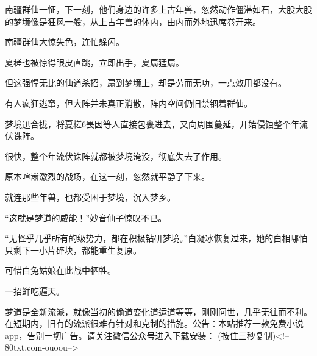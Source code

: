 \begin{this_body}
南疆群仙一怔，下一刻，他们身边的许多上古年兽，忽然动作僵滞如石，大股大股的梦境像是狂风一般，从上古年兽的体内，由内而外地迅席卷开来。

南疆群仙大惊失色，连忙躲闪。

夏槎也被惊得眼皮直跳，立即出手，夏扇猛扇。

但这强悍无比的仙道杀招，扇到梦境上，却是劳而无功，一点效用都没有。

有人疯狂逃窜，但大阵并未真正消散，阵内空间仍旧禁锢着群仙。

梦境迅合拢，将夏槎6畏因等人直接包裹进去，又向周围蔓延，开始侵蚀整个年流伏诛阵。

很快，整个年流伏诛阵就都被梦境淹没，彻底失去了作用。

原本喧嚣激烈的战场，在这一刻，忽然就平静了下来。

就连那些年兽，也都受困于梦境，沉入梦乡。

“这就是梦道的威能！”妙音仙子惊叹不已。

“无怪乎几乎所有的级势力，都在积极钻研梦境。”白凝冰恢复过来，她的白相哪怕只剩下一小片碎块，都能重生复原。

可惜白兔姑娘在此战中牺牲。

一招鲜吃遍天。

梦道是全新流派，就像当初的偷道变化道运道等等，刚刚问世，几乎无往而不利。在短期内，旧有的流派很难有针对和克制的措施。公告：本站推荐一款免费小说app，告别一切广告。请关注微信公众号进入下载安装： (按住三秒复制)<!--80txt.com-ouoou-->

\end{this_body}

